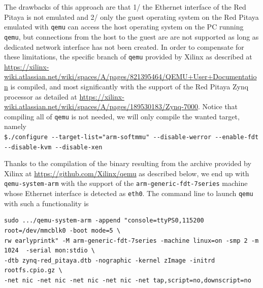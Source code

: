 \documentclass{article}
\begin{document}
{The drawbacks of this approach are that 1/ the Ethernet interface of the Red Pitaya is not
emulated and 2/ only the guest operating system on the Red Pitaya emulated with 
{\tt qemu} can access the host operating system on the PC running {\tt qemu}, but connections
from the host to the guest are are not supported as long as dedicated network interface has
not been created. In order to compensate for these limitations, the specific branch of
{\tt qemu} provided by Xilinx as described at 
\url{https://xilinx-wiki.atlassian.net/wiki/spaces/A/pages/821395464/QEMU+User+Documentation}
is compiled, and most significantly with the support of the Red Pitaya Zynq processor as
detailed at \url{https://xilinx-wiki.atlassian.net/wiki/spaces/A/pages/189530183/Zynq-7000}.
Notice that compiling all of {\tt qemu} is not needed,
we will only compile the wanted target,
namely \\
\verb~$./configure --target-list="arm-softmmu" --disable-werror --enable-fdt --disable-kvm --disable-xen~

Thanks to the compilation of the binary resulting from the archive provided by Xilinx at
\url{https://github.com/Xilinx/qemu} as described below, we end up with 
{\tt qemu-system-arm} with the support of the {\tt arm-generic-fdt-7series}
machine whose Ethernet interface is detected as {\tt eth0}. The command line to launch 
{\tt qemu} with such a functionality is
\begin{verbatim}
sudo .../qemu-system-arm -append "console=ttyPS0,115200 root=/dev/mmcblk0 -boot mode=5 \
rw earlyprintk" -M arm-generic-fdt-7series -machine linux=on -smp 2 -m 1024  -serial mon:stdio \
-dtb zynq-red_pitaya.dtb -nographic -kernel zImage -initrd rootfs.cpio.gz \
-net nic -net nic -net nic -net nic -net tap,script=no,downscript=no
\end{verbatim}

}
\end{document}
